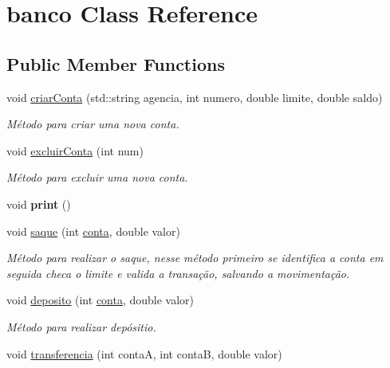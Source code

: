 \hypertarget{classbanco}{}\section{banco Class Reference}
\label{classbanco}
\subsection*{Public Member Functions}
\begin{DoxyCompactItemize}
\item 
void \mbox{\hyperlink{classbanco_af0a23a450d1f0a413196a0e0f20225b9}{criar\+Conta}} (std\+::string agencia, int numero, double limite, double saldo)
\begin{DoxyCompactList}\small\item\em Método para criar uma nova conta. \end{DoxyCompactList}\item 
\mbox{\label{classbanco_ac2da6ef968feef36e1333e37e1b8835b}} 
void \mbox{\hyperlink{classbanco_ac2da6ef968feef36e1333e37e1b8835b}{excluir\+Conta}} (int num)
\begin{DoxyCompactList}\small\item\em Método para excluir uma nova conta. \end{DoxyCompactList}\item 
\mbox{\label{classbanco_ab476edc04466510bb36cb2a4d04c6cce}} 
void {\bfseries print} ()
\item 
void \mbox{\hyperlink{classbanco_a9ae918d40986ad66ba6b06874dd51ceb}{saque}} (int \mbox{\hyperlink{classconta}{conta}}, double valor)
\begin{DoxyCompactList}\small\item\em Método para realizar o saque, nesse método primeiro se identifica a conta em seguida checa o limite e valida a transação, salvando a movimentação. \end{DoxyCompactList}\item 
void \mbox{\hyperlink{classbanco_a5299f885390fee021a84ffb309a0ca2f}{deposito}} (int \mbox{\hyperlink{classconta}{conta}}, double valor)
\begin{DoxyCompactList}\small\item\em Método para realizar depósitio. \end{DoxyCompactList}\item 
void \mbox{\hyperlink{classbanco_a81638b3957b2c422e58df4ace22d0d55}{transferencia}} (int contaA, int contaB, double valor)

\end{DoxyCompactItemize}
